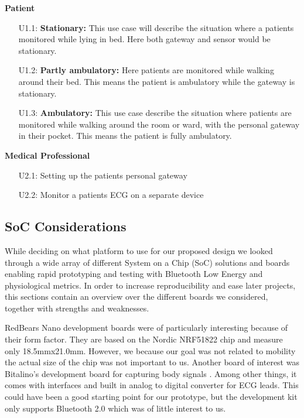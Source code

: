 \newline
\noindent
\textbf{Patient}

\begin{enumerate}

  \item[\textsc{U1.1}:]\textbf{Stationary:} This use case will describe the situation where a patients monitored while lying in bed. Here both gateway and sensor would be stationary.

  \item[\textsc{U1.2}:]\textbf{Partly ambulatory:} Here patients are monitored while walking around their bed. This means the patient is ambulatory while the gateway is stationary.

  \item[\textsc{U1.3}:]\textbf{Ambulatory:} This use case describe the situation where patients are monitored while walking around the room or ward, with the personal gateway in their pocket. This means the patient is fully ambulatory.

\end{enumerate}

\newline
\noindent
\textbf{Medical Professional}
\begin{enumerate}

  \item[\textsc{U2.1}:] Setting up the patients personal gateway
  \item[\textsc{U2.2}:] Monitor a patients ECG on a separate device

\end{enumerate}


\subsection{SoC Considerations} %
\label{sub:soc_considerations}

While deciding on what platform to use for our proposed design we looked through a wide array of different System on a Chip (SoC) solutions and boards enabling rapid prototyping and testing with Bluetooth Low Energy and physiological metrics. In order to increase reproducibility and ease later projects, this sections contain an overview over the different boards we considered, together with strengths and weaknesses.

RedBears Nano \cite{newRef_36} development boards were of particularly interesting because of their form factor. They are based on the Nordic NRF51822 chip and measure only 18.5mmx21.0mm. However, we because our goal was not related to mobility the actual size of the chip was not important to us. Another board of interest was Bitalino's development board for capturing body signals \cite{newRef_37}. Among other things, it comes with interfaces and built in analog to digital converter for ECG leads. This could have been a good starting point for our prototype, but the development kit only supports Bluetooth 2.0 which was of little interest to us.

